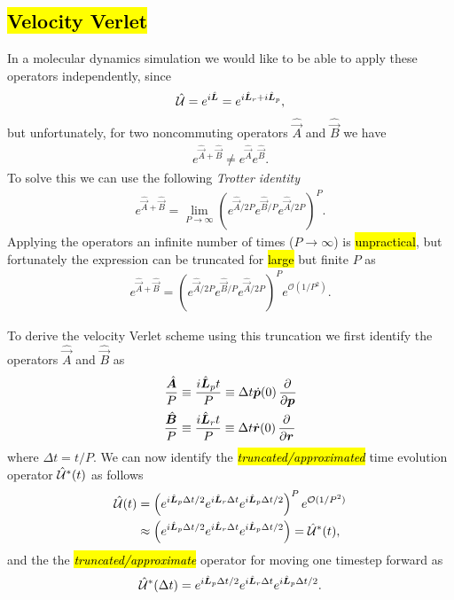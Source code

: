 \subsection[Velocity Verlet]{\hl{Velocity Verlet}}
In a molecular dynamics simulation we would like to be able to apply these operators independently, since
\begin{align*}
    \hat{\mathcal{U}} = e^{i\hat{\boldsymbol{L}}} = e^{i\hat{\boldsymbol{L}}_r + i\hat{\boldsymbol{L}}_p},
\end{align*}
but unfortunately, for two noncommuting operators $\hat {\vec A}$ and $\hat {\vec B}$ we have
\begin{align*}
    e^{\hat {\vec A} + \hat {\vec B}} \neq e^{\hat {\vec A}} e^{\hat {\vec B}}.
\end{align*}
To solve this we can use the following \emph{Trotter identity}
\begin{align*}
    e^{\hat {\vec A} + \hat {\vec B}} = \lim_{P\rightarrow \infty} \left( e^{\hat {\vec A}/2P} e^{\hat {\vec B}/P} e^{\hat {\vec A}/2P} \right)^P.
\end{align*}
Applying the operators an infinite number of times ($P\rightarrow \infty$) is \hl{unpractical}, but fortunately the expression can be truncated for \hl{large} but finite $P$ as
\begin{align}
    e^{\hat {\vec A} + \hat {\vec B}} = \left( e^{\hat {\vec A}/2P} e^{\hat {\vec B}/P} e^{\hat {\vec A}/2P} \right)^P e^{\mathcal{O}(1/P^2)}.
    \label{eq:liou_time_exact}
\end{align}

To derive the velocity Verlet scheme using this truncation we first identify the operators $\hat {\vec A}$ and $\hat {\vec B}$ as
\begin{align*}
    \frac{\hat {\vec A}}{P} &\equiv \frac{\Liou_p t}{P} \equiv \Delta t \dot {\vec p}(0) \dpd{}{\vec p} \\
    \frac{\hat {\vec B}}{P} &\equiv \frac{\Liou_r t}{P} \equiv \Delta t \dot \rvec (0) \dpd{}{\rvec}
\end{align*}
where $\Delta t = t/P$. We can now identify the \hl{\emph{truncated/approximated}} time evolution operator $\hat{\mathcal{U}}^*(t)$ as follows
\begin{align}
    \hat{\mathcal{U}}(t) 
    &= \left( e^{i\hat{\boldsymbol{L}}_p\Delta t/2} e^{i\hat{\boldsymbol{L}}_r \Delta t} e^{i\hat{\boldsymbol{L}}_p \Delta t/2} \right)^P e^{\mathcal{O}(1/P^2)} \nonumber\\
    &\approx \left( e^{i\hat{\boldsymbol{L}}_p\Delta t/2} e^{i\hat{\boldsymbol{L}}_r \Delta t} e^{i\hat{\boldsymbol{L}}_p \Delta t/2} \right) = \hat{\mathcal{U}}^*(t),
    \label{eq:liou_time_trunc}
\end{align}
and the the \hl{\emph{truncated/approximate}} operator for moving one timestep forward as
\begin{align}
    \hat{\mathcal{U}}^*(\Delta t) = e^{i\hat{\boldsymbol{L}}_p\Delta t/2} e^{i\hat{\boldsymbol{L}}_r \Delta t} e^{i\hat{\boldsymbol{L}}_p \Delta t/2}.
    \label{eq:liou_onetime_trunc}
\end{align}

